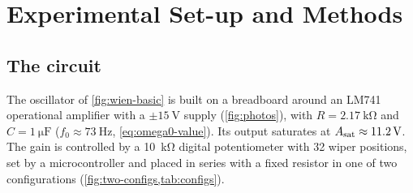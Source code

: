\chapter{Experimental Set-up and Methods}\label{ch:methods}
\chapterlists


\section{The circuit}\label{sec:circuit}

The oscillator of \cref{fig:wien-basic} is built on a breadboard around an LM741 operational amplifier
with a $\pm\SI{15}{\volt}$ supply (\cref{fig:photos}), with $R=\SI{2.17}{\kilo\ohm}$ and
$C=\SI{1}{\micro\farad}$ ($f_{0}\approx\SI{73}{\hertz}$, \cref{eq:omega0-value}). Its output
saturates at $A_{\mathrm{sat}}\approx\SI{11.2}{\volt}$. The gain is controlled by a \SI{10}{\kilo\ohm}
digital potentiometer with 32 wiper positions, set by a microcontroller and placed in series with a fixed
resistor in one of two configurations (\cref{fig:two-configs,tab:configs}).

